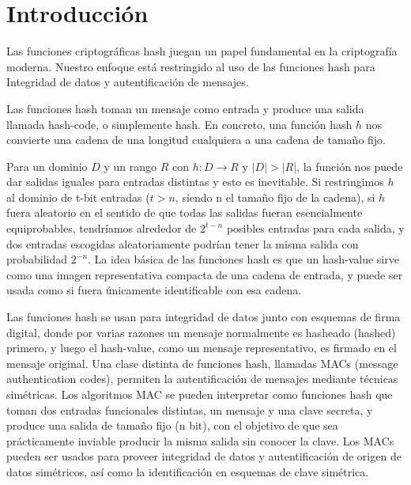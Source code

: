 \documentclass[a4paper, 12pt]{article} %
\begin{document}


\newpage

\tableofcontents

\listoffigures

\newpage

\section{Introducción}
Las funciones criptográficas hash juegan un papel fundamental en la criptografía
moderna. Nuestro enfoque está restringido al uso de las funciones hash para Integridad
de datos y autentificación de mensajes.

Las funciones hash toman un mensaje como entrada y produce una salida llamada hash-code,
o simplemente hash. En concreto, una función hash $h$ nos convierte una cadena de una
longitud cualquiera a una cadena de tamaño fijo.

Para un dominio $D$ y un rango $R$ con $h: D \rightarrow R$ y $|D| > |R|$, la función nos puede dar salidas iguales
para entradas distintas y esto es inevitable.
Si restringimos $h$ al dominio de t-bit entradas ($t>n$, siendo n el tamaño fijo de la cadena),
si $h$ fuera aleatorio en el sentido de que todas las salidas fueran esencialmente equiprobables,
tendríamos alrededor de $2^{t-n}$ posibles entradas para cada salida, y dos entradas escogidas
aleatoriamente podrían tener la misma salida con probabilidad $2^{-n}$.
La idea básica de las funciones hash es que un hash-value sirve como una imagen representativa
compacta de una cadena de entrada, y puede ser usada como si fuera únicamente identificable con
esa cadena.

Las funciones hash se usan para integridad de datos junto con esquemas de firma digital, donde
por varias razones un mensaje normalmente es hasheado (hashed) primero, y luego el hash-value,
como un mensaje representativo, es firmado en el mensaje original.
Una clase distinta de funciones hash, llamadas MACs (message authentication codes), permiten la
autentificación de mensajes mediante técnicas simétricas.
Los algoritmos MAC se pueden interpretar como funciones hash que toman dos entradas funcionales
distintas, un mensaje y una clave secreta, y produce una salida de tamaño fijo (n bit), con
el objetivo de que sea prácticamente inviable producir la misma salida sin conocer la clave.
Los MACs pueden ser usados para proveer integridad de datos y autentificación de origen de
datos simétricos, así como la identificación en esquemas de clave simétrica.
\end{document}
